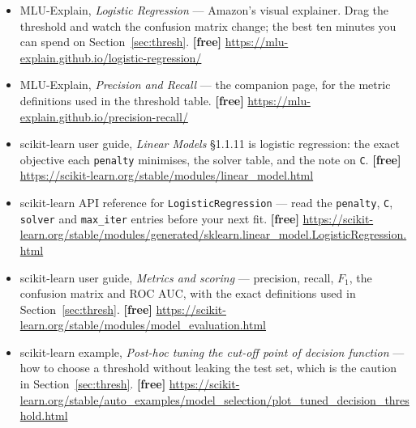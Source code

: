 \documentclass[11pt]{article}
\begin{document}
\begin{itemize}[leftmargin=*]
  \item MLU-Explain, \emph{Logistic Regression} --- Amazon's visual
    explainer. Drag the threshold and watch the confusion matrix change; the
    best ten minutes you can spend on Section~\ref{sec:thresh}.
    \textbf{[free]} \url{https://mlu-explain.github.io/logistic-regression/}
  \item MLU-Explain, \emph{Precision and Recall} --- the companion page, for
    the metric definitions used in the threshold table. \textbf{[free]}
    \url{https://mlu-explain.github.io/precision-recall/}
  \item scikit-learn user guide, \emph{Linear Models} §1.1.11 is logistic
    regression: the exact objective each \texttt{penalty} minimises, the
    solver table, and the note on \texttt{C}. \textbf{[free]}
    \url{https://scikit-learn.org/stable/modules/linear_model.html}
  \item scikit-learn API reference for \texttt{LogisticRegression} --- read
    the \texttt{penalty}, \texttt{C}, \texttt{solver} and \texttt{max\_iter}
    entries before your next fit. \textbf{[free]}
    \url{https://scikit-learn.org/stable/modules/generated/sklearn.linear_model.LogisticRegression.html}
  \item scikit-learn user guide, \emph{Metrics and scoring} --- precision,
    recall, $F_1$, the confusion matrix and ROC AUC, with the exact
    definitions used in Section~\ref{sec:thresh}. \textbf{[free]}
    \url{https://scikit-learn.org/stable/modules/model_evaluation.html}
  \item scikit-learn example, \emph{Post-hoc tuning the cut-off point of
    decision function} --- how to choose a threshold without leaking the test
    set, which is the caution in Section~\ref{sec:thresh}. \textbf{[free]}
    \url{https://scikit-learn.org/stable/auto_examples/model_selection/plot_tuned_decision_threshold.html}
\end{itemize}

\enlargethispage{4\baselineskip}
\notesources{\AMLUnitVSources}
\end{document}
